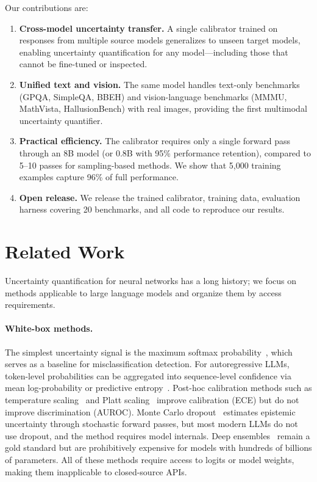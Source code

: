 \documentclass{colm2026}
\begin{document}
Our contributions are:
\begin{enumerate}
    \item \textbf{Cross-model uncertainty transfer.} A single calibrator trained on responses from multiple source models generalizes to unseen target models, enabling uncertainty quantification for any model---including those that cannot be fine-tuned or inspected.
    \item \textbf{Unified text and vision.} The same model handles text-only benchmarks (GPQA, SimpleQA, BBEH) and vision-language benchmarks (MMMU, MathVista, HallusionBench) with real images, providing the first multimodal uncertainty quantifier.
    \item \textbf{Practical efficiency.} The calibrator requires only a single forward pass through an 8B model (or 0.8B with 95\% performance retention), compared to 5--10 passes for sampling-based methods. We show that 5,000 training examples capture 96\% of full performance.
    \item \textbf{Open release.} We release the trained calibrator, training data, evaluation harness covering 20 benchmarks, and all code to reproduce our results.
\end{enumerate}

\section{Related Work}
\label{sec:related}

Uncertainty quantification for neural networks has a long history; we focus on methods applicable to large language models and organize them by access requirements.

\paragraph{White-box methods.}
The simplest uncertainty signal is the maximum softmax probability~\citep{hendrycks2017baseline}, which serves as a baseline for misclassification detection. For autoregressive LLMs, token-level probabilities can be aggregated into sequence-level confidence via mean log-probability or predictive entropy~\citep{malinin2021uncertainty}. Post-hoc calibration methods such as temperature scaling~\citep{guo2017calibration} and Platt scaling~\citep{platt1999probabilistic} improve calibration (ECE) but do not improve discrimination (AUROC). Monte Carlo dropout~\citep{gal2016dropout} estimates epistemic uncertainty through stochastic forward passes, but most modern LLMs do not use dropout, and the method requires model internals. Deep ensembles~\citep{lakshminarayanan2017simple} remain a gold standard but are prohibitively expensive for models with hundreds of billions of parameters. All of these methods require access to logits or model weights, making them inapplicable to closed-source APIs.
\end{document}
